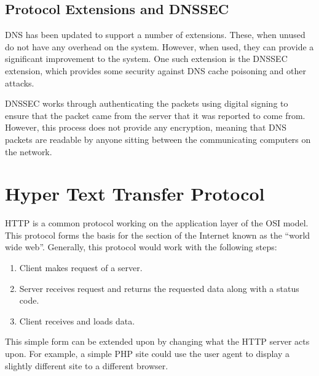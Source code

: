 \documentclass[a4paper,11pt]{report}
\begin{document}
		\subsection{Protocol Extensions and DNSSEC}
			DNS has been updated to support a number of extensions. 
			These, when unused do not have any overhead on the system. 
			However, when used, they can provide a significant improvement to the system. 
			One such extension is the DNSSEC extension, which provides some security against DNS cache poisoning and other attacks. 

			DNSSEC works through authenticating the packets using digital signing to ensure that the packet came from the server that it was reported to come from. 
			However, this process does not provide any encryption, meaning that DNS packets are readable by anyone sitting between the communicating computers on the network. 

	\section{Hyper Text Transfer Protocol}
		HTTP is a common protocol working on the application layer of the OSI model. 
		This protocol forms the basis for the section of the Internet known as the ``world wide web''. 
		Generally, this protocol would work with the following steps:
		\begin{enumerate}
			\item Client makes request of a server.
			\item Server receives request and returns the requested data along with a status code. 
			\item Client receives and loads data.
		\end{enumerate}

		This simple form can be extended upon by changing what the HTTP server acts upon. 
		For example, a simple PHP site could use the user agent to display a slightly different site to a different browser. 
\end{document}
